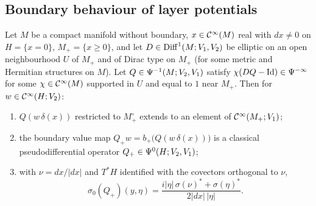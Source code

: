 \subsection*{Boundary behaviour of layer potentials}

\begin{theorem}\label{boundary:thm:layer}
Let $M$ be a compact manifold without boundary, $x\in\mathcal{C}^\infty(M)$ real with $dx\ne0$ on
$H=\{x=0\}$, $M_+=\{x\ge0\}$, and let $D\in\operatorname{Diff}^{1}(M;V_1,V_2)$ be elliptic on an open
neighbourhood $U$ of $M_+$ and of Dirac type on $M_+$ (for some metric and Hermitian
structures on $M$). Let $Q\in\Psi^{-1}(M;V_2,V_1)$ satisfy $\chi(DQ-\operatorname{Id})\in
\Psi^{-\infty}$ for some $\chi\in\mathcal{C}^\infty(M)$ supported in $U$ and equal to $1$ near
$M_+$. Then for $w\in\mathcal{C}^\infty(H;V_2)$:
\begin{enumerate}[label=(\roman*)]
\item $Q(w\,\delta(x))$ restricted to $M_+^\circ$ extends to an element of
$\mathcal{C}^\infty(M_+;V_1)$;
\item the boundary value map $Q_+w=b_+\big(Q(w\,\delta(x))\big)$ is a classical
pseudodifferential operator $Q_+\in\Psi^{0}(H;V_2,V_1)$;
\item with $\nu=dx/|dx|$ and $T^*H$ identified with the covectors orthogonal to $\nu$,
\begin{equation*}
\sigma_0(Q_+)(y,\eta)=\frac{i|\eta|\,\sigma(\nu)^*+\sigma(\eta)^*}{2|dx|\,|\eta|}.
\end{equation*}
\end{enumerate}
\end{theorem}
